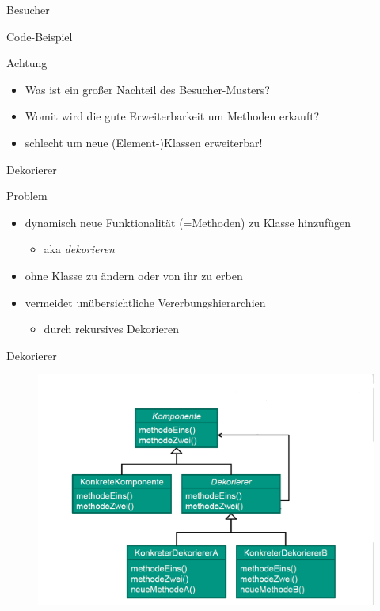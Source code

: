 \documentclass[18pt]{beamer}
\begin{document}
	\begin{frame}{Besucher}
	\begin{center}
		\begin{huge}
			 Code-Beispiel
		\end{huge}
	\end{center}
		\pause
		\begin{alertblock}{Achtung}
			\begin{itemize}
				\item Was ist ein großer Nachteil des Besucher-Musters?
				\item Womit wird die gute Erweiterbarkeit um Methoden erkauft? \pause
				\item schlecht um neue (Element-)Klassen erweiterbar!
			\end{itemize}
		\end{alertblock}
	\end{frame}

	\begin{frame}{Dekorierer}
		\begin{block}{Problem}
			\begin{itemize}
				\item dynamisch neue Funktionalität (=Methoden) zu Klasse hinzufügen
				\begin{itemize}
					\item aka \emph{dekorieren}
				\end{itemize}
				\item ohne Klasse zu ändern oder von ihr zu erben
				\item vermeidet unübersichtliche Vererbungshierarchien
				\begin{itemize}
					\item durch rekursives Dekorieren
				\end{itemize}
			\end{itemize}
		\end{block}
	\end{frame}

	\begin{frame}{Dekorierer}
		\begin{figure}
			\includegraphics[scale=0.35]{./pics/tut4/decor.png}
		\end{figure}
	\end{frame}
\end{document}
